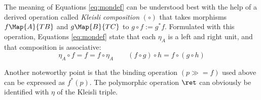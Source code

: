 \begin{rem}
  The meaning of Equations \eqref{eq:mondef} can be understood best with the
  help of a derived operation called \emph{Kleisli composition} $(\circ)$ that takes
  morphisms $f \Map{A}{TB}$ and $g \Map{B}{TC}$ to $g \circ f := g^*f$. Formulated
  with this operation, Equations \eqref{eq:mondef} state that each $\eta_A$ is a left
  and right unit, and that composition is associative:
  \begin{equation}
    \label{eq:kleislicomp}
    \eta_A\circ f = f = f \circ \eta_A \qquad (f \circ g) \circ h = f \circ (g \circ h)
  \end{equation}

  Another noteworthy point is that the binding operation $(p \gg= f)$ used above
  can be expressed as $f^*(p)$. The polymorphic operation $\ret$ can obviously
  be identified with $\eta$ of the Kleisli triple.
\end{rem}

